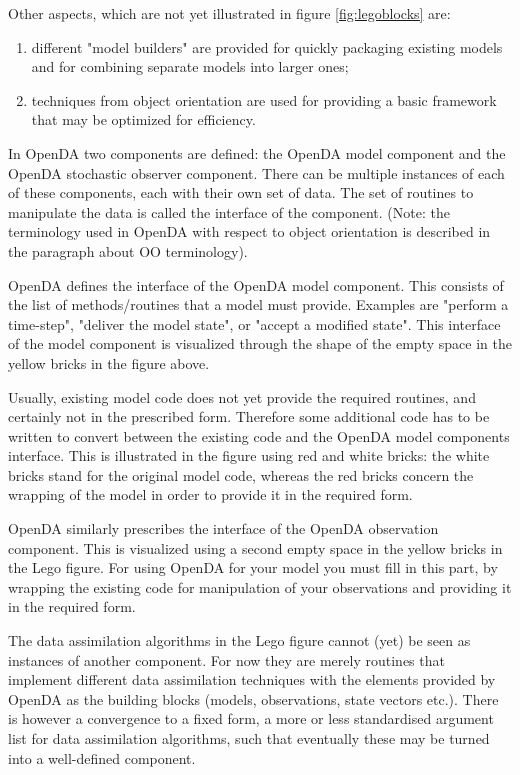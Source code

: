 Other aspects, which are not yet illustrated in figure \ref{fig:legoblocks} are:

\begin{enumerate}
\item different "model builders" are provided for quickly packaging existing models and for combining separate models into larger ones;
\item techniques from object orientation are used for providing a basic framework that may be optimized for efficiency.
\end{enumerate}

In OpenDA two components are defined: the OpenDA model component and the OpenDA stochastic observer component. There can be multiple instances of each of these components, each with their own set of data. The set of routines to manipulate the data is called the interface of the component. (Note: the terminology used in OpenDA with respect to object orientation is described in the paragraph about OO terminology).

OpenDA defines the interface of the OpenDA model component. This consists of the list of methods/routines that a model must provide. Examples are "perform a time-step", "deliver the model state", or "accept a modified state". This interface of the model component is visualized through the shape of the empty space in the yellow bricks in the figure above.

Usually, existing model code does not yet provide the required routines, and certainly not in the prescribed form. Therefore some additional code has to be written to convert between the existing code and the OpenDA model components interface. This is illustrated in the figure using red and white bricks: the white bricks stand for the original model code, whereas the red bricks concern the wrapping of the model in order to provide it in the required form.

OpenDA similarly prescribes the interface of the OpenDA observation component. This is visualized using a second empty space in the yellow bricks in the Lego figure. For using OpenDA for your model you must fill in this part, by wrapping the existing code for manipulation of your observations and providing it in the required form.

The data assimilation algorithms in the Lego figure cannot (yet) be seen as instances of another component. For now they are merely routines that implement different data assimilation techniques with the elements provided by OpenDA as the building blocks (models, observations, state vectors etc.). There is however a convergence to a fixed form, a more or less standardised argument list for data assimilation algorithms, such that eventually these may be turned into a well-defined component.

